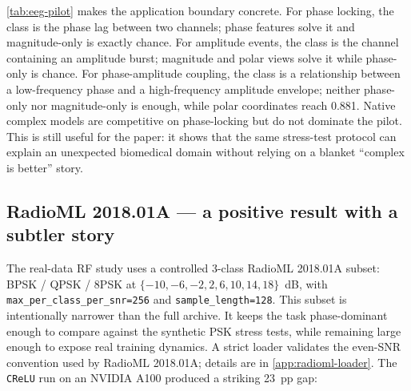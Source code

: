 \documentclass{article}
\providecommand{\Cref}[1]{\autoref{#1}}
\newcommand{\code}[1]{\texttt{#1}}
\begin{document}
\begin{table}[t]
  \centering
  \small
  \caption{EEG analytic-signal pilot, standard preset
    (3 seeds, 128 examples/class, 4 channels, 64 time steps, 120
    training steps, \code{crelu}). Chance is 0.25. The result is a
    representation map, not a claim about clinical EEG performance.}
  \label{tab:eeg-pilot}
\end{table}

\Cref{tab:eeg-pilot} makes the application boundary concrete. For
phase locking, the class is the phase lag between two channels; phase
features solve it and magnitude-only is exactly chance. For amplitude
events, the class is the channel containing an amplitude burst;
magnitude and polar views solve it while phase-only is chance. For
phase-amplitude coupling, the class is a relationship between a
low-frequency phase and a high-frequency amplitude envelope; neither
phase-only nor magnitude-only is enough, while polar coordinates reach
0.881. Native complex models are competitive on phase-locking but do
not dominate the pilot. This is still useful for the paper: it shows
that the same stress-test protocol can explain an unexpected
biomedical domain without relying on a blanket ``complex is better''
story.

\subsection{RadioML 2018.01A --- a positive result with a subtler story}
\label{sec:radioml}

The real-data RF study uses a controlled 3-class RadioML 2018.01A
subset: BPSK / QPSK / 8PSK at
$\{-10, -6, -2, 2, 6, 10, 14, 18\}$~dB, with
\code{max\_per\_class\_per\_snr=256} and \code{sample\_length=128}.
This subset is intentionally narrower than the full archive. It keeps
the task phase-dominant enough to compare against the synthetic PSK
stress tests, while remaining large enough to expose real training
dynamics. A strict loader validates the even-SNR convention used by
RadioML 2018.01A; details are in \Cref{app:radioml-loader}. The
\code{CReLU} run on an NVIDIA A100 produced a striking 23~pp gap:
\end{document}
